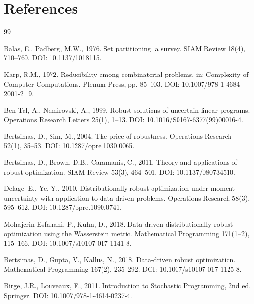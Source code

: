 \documentclass[preprint,review,11pt,authoryear]{elsarticle}
\begin{document}
\section*{References}
\begin{thebibliography}{99}

Balas, E., Padberg, M.W., 1976. Set partitioning: a survey. SIAM Review 18(4), 710--760. DOI: 10.1137/1018115.

Karp, R.M., 1972. Reducibility among combinatorial problems, in: Complexity of Computer Computations. Plenum Press, pp. 85--103. DOI: 10.1007/978-1-4684-2001-2\_9.

Ben-Tal, A., Nemirovski, A., 1999. Robust solutions of uncertain linear programs. Operations Research Letters 25(1), 1--13. DOI: 10.1016/S0167-6377(99)00016-4.

Bertsimas, D., Sim, M., 2004. The price of robustness. Operations Research 52(1), 35--53. DOI: 10.1287/opre.1030.0065.

Bertsimas, D., Brown, D.B., Caramanis, C., 2011. Theory and applications of robust optimization. SIAM Review 53(3), 464--501. DOI: 10.1137/080734510.

Delage, E., Ye, Y., 2010. Distributionally robust optimization under moment uncertainty with application to data-driven problems. Operations Research 58(3), 595--612. DOI: 10.1287/opre.1090.0741.

Mohajerin Esfahani, P., Kuhn, D., 2018. Data-driven distributionally robust optimization using the Wasserstein metric. Mathematical Programming 171(1--2), 115--166. DOI: 10.1007/s10107-017-1141-8.

Bertsimas, D., Gupta, V., Kallus, N., 2018. Data-driven robust optimization. Mathematical Programming 167(2), 235--292. DOI: 10.1007/s10107-017-1125-8.

Birge, J.R., Louveaux, F., 2011. Introduction to Stochastic Programming, 2nd ed. Springer. DOI: 10.1007/978-1-4614-0237-4.


\end{thebibliography}
\end{document}
